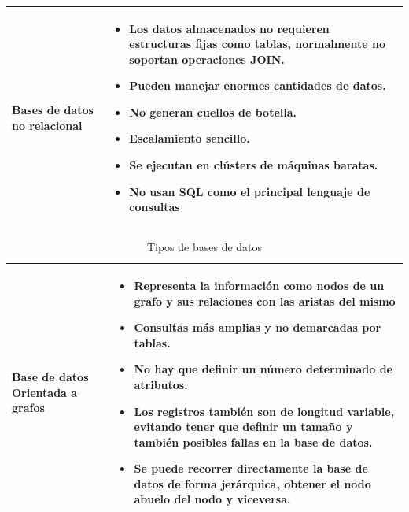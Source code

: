 \begin{table}[b!]
\begin{tabular}{|p{2cm}|ll}
		\hline
		\multicolumn{1}{|p{5cm}|}{Bases de datos no relacional} &   
		\multicolumn{1}{p{10cm}|}{
		\begin{itemize}
		\vspace{-5mm}
		\item Los datos almacenados no requieren estructuras fijas como tablas, normalmente no soportan operaciones JOIN.
		\item Pueden manejar enormes cantidades de datos.
		\item No generan cuellos de botella.
		\item Escalamiento sencillo.
		\item Se ejecutan en clústers de máquinas baratas.
		\item No usan SQL como el principal lenguaje de consultas \cite{29}
		\end{itemize}} \\ 
		\hline
	\end{tabular}
\end{table}

\newpage
\begin{table}[b!]
	\centering
	\vspace{-5mm}
	\begin{tabular}{|p{2cm}|ll}
		\hline
		\multicolumn{1}{|p{5cm}|}{Base de datos Orientada a grafos} &   
		\multicolumn{2}{p{10cm}|}{\begin{itemize}
		\vspace{-5mm}
		\item Representa la información como nodos de un grafo y sus relaciones con las aristas del mismo
		\item Consultas más amplias y no demarcadas por tablas.
		\item No hay que definir un número determinado de atributos.
		\item Los registros también son de longitud variable, evitando tener que definir un tamaño y también posibles fallas en la base de datos.
		\item Se puede recorrer directamente la base de datos de forma jerárquica, obtener el nodo abuelo del nodo y viceversa.
		\cite{30}
		\end{itemize}} \\
		\hline
	\end{tabular}
	\caption{Tipos de bases de datos}
	\label{table: comparacion de bd}
\end{table}
    

